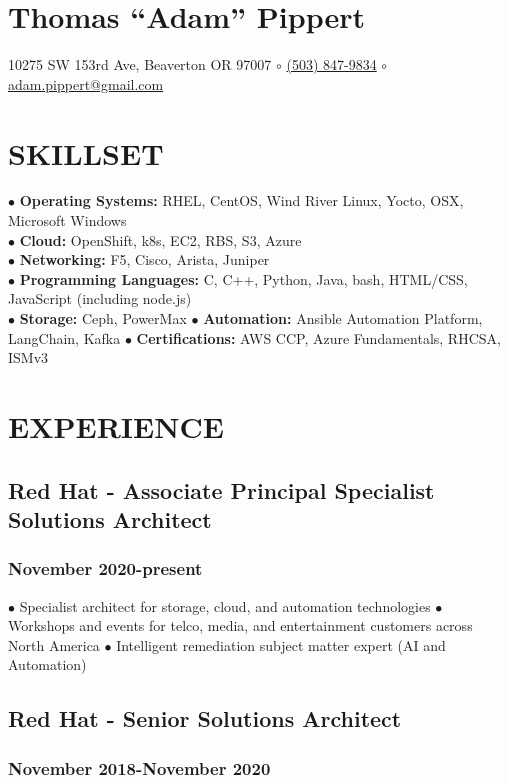 \documentclass{article}
\begin{document}
\section*{Thomas ``Adam'' Pippert}
10275 SW 153rd Ave, Beaverton OR 97007 $\circ$
\href{tel:+15038479834}{(503) 847-9834} $\circ$
\href{mailto:adam.pippert@gmail.com}{adam.pippert@gmail.com}

\section*{SKILLSET}


$\bullet$ \textbf{Operating Systems:} RHEL, CentOS, Wind River Linux, Yocto, OSX, Microsoft Windows\\
$\bullet$ \textbf{Cloud:} OpenShift, k8s, EC2, RBS, S3, Azure\\
$\bullet$ \textbf{Networking:} F5, Cisco, Arista, Juniper\\
$\bullet$ \textbf{Programming Languages:} C, C++, Python, Java, bash, HTML/CSS, JavaScript (including node.js)\\
$\bullet$ \textbf{Storage:} Ceph, PowerMax
$\bullet$ \textbf{Automation:} Ansible Automation Platform, LangChain, Kafka
$\bullet$ \textbf{Certifications:} AWS CCP, Azure Fundamentals, RHCSA, ISMv3 


\section*{EXPERIENCE}

\subsection*{Red Hat - Associate Principal Specialist Solutions Architect}
\subsubsection*{November 2020-present}

$\bullet$ Specialist architect for storage, cloud, and automation technologies 
$\bullet$ Workshops and events for telco, media, and entertainment customers across North America
$\bullet$ Intelligent remediation subject matter expert (AI and Automation)

\subsection*{Red Hat - Senior Solutions Architect}
\subsubsection*{November 2018-November 2020}
\end{document}
